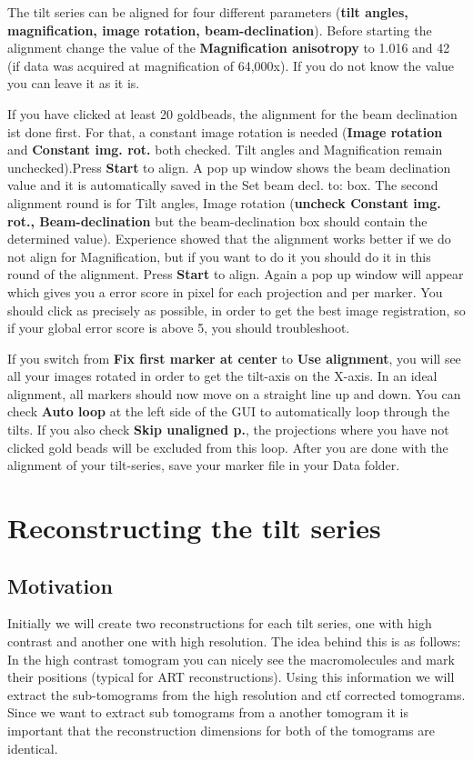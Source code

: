 \documentclass[12pt,a4paper]{scrartcl}
\begin{document}
{\par The tilt series can be aligned for four different parameters (\textbf{tilt angles, magnification, image rotation, beam-declination}). Before starting the alignment change the value of the \textbf{Magnification anisotropy} to 1.016 and 42 (if data was acquired at magnification of 64,000x). If you do not know the value you can leave it as it is. 
\par If you have clicked at least 20 goldbeads, the alignment for the beam declination ist done first. For that, a constant image rotation is needed (\textbf{Image rotation} and \textbf{Constant img. rot.} both checked. Tilt angles and Magnification remain unchecked).Press \textbf{Start} to align. A pop up window shows the beam declination value and it is automatically saved in the Set beam decl. to: box. The second alignment round is for Tilt angles, Image rotation (\textbf{uncheck Constant img. rot., Beam-declination } but the beam-declination box should contain the determined value). Experience showed that the alignment works better if we do not align for Magnification, but if you want to do it you should do it in this round of the alignment. 
Press \textbf{Start} to align. Again a pop up window will appear which gives you a error score in pixel for each projection and per marker. You should click as precisely as possible, in order to get the best image registration, so if your global error score is above 5, you should troubleshoot.
\par If you switch from \textbf{Fix first marker at center} to \textbf{Use alignment}, you will see all your images rotated in order to get the tilt-axis on the X-axis. In an ideal alignment, all markers should now move on a straight line up and down. You can check \textbf{Auto loop} at the left side of the GUI to automatically loop through the tilts. If you also check \textbf{Skip unaligned p.}, the projections where you have not clicked gold beads will be excluded from this loop. After you are done with the alignment of your tilt-series, save your marker file in your Data folder.


\section{Reconstructing the tilt series}
\subsection{Motivation}
Initially we will create two reconstructions for each tilt series, one with high contrast and another one with high resolution. The idea behind this is as follows: In the high contrast tomogram you can nicely see the macromolecules and mark their positions (typical for ART reconstructions). Using this information we will extract the sub-tomograms from the high resolution and ctf corrected tomograms. Since we want to extract sub tomograms from a another tomogram it is important that the reconstruction dimensions for both of the tomograms are identical.
}
\end{document}

